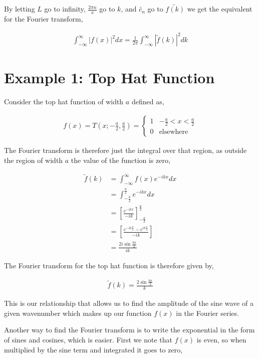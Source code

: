 \documentclass[11pt]{amsart}
\begin{document}
By letting $L$ go to infinity, $\frac{2\pi n}{x}$ go to $k$, and $\tilde{c_n}$ go to $\tilde{f(k)}$ we get the equivalent for the Fourier transform,

\begin{align*}
  \int_{-\infty}^{\infty}{|f(x)|}^2dx = \frac{1}{2\pi}\int_{-\infty}^{\infty}{|\tilde{f}(k)|}^2 dk
\end{align*}

\section{Example 1: Top Hat Function}

Consider the top hat function of width $a$ defined as,

\begin{align*}
  f(x) = T\left(x; -\frac{a}{2}, \frac{a}{2}\right) =
  \begin{cases}
    1 & -\frac{a}{2} < x < \frac{a}{2} \\
    0 & \text{elsewhere}
  \end{cases}
\end{align*}

The Fourier transform is therefore just the integral over that region, as outside the region of width $a$ the value of the function is zero,

\begin{align*}
  \tilde{f}(k) &= \int_{-\infty}^{\infty}f(x)e^{-ikx} dx \\
               &= \int_{-\frac{a}{2}}^{\frac{a}{2}}e^{-ikx} dx \\
               &= {\left[\frac{e^{-ikx}}{-ik}\right]}_{-\frac{a}{2}}^{\frac{a}{2}} \\
               &= \left[\frac{e^{-ik\frac{a}{2}}-e^{ik\frac{a}{2}}}{-ik}\right] \\
               &= \frac{2i\sin{\frac{ka}{2}}}{ik}
\end{align*}

The Fourier transform for the top hat function is therefore given by,

\begin{align*}
  \tilde{f}(k) = \frac{2\sin{\frac{ka}{2}}}{k}
\end{align*}

This is our relationship that allows us to find the amplitude of the sine wave of a given wavenumber which makes up our function $f(x)$ in the Fourier series.

Another way to find the Fourier transform is to write the exponential in the form of sines and cosines, which is easier. First we note that $f(x)$ is even, so when multiplied by the sine term and integrated it goes to zero,
\end{document}
